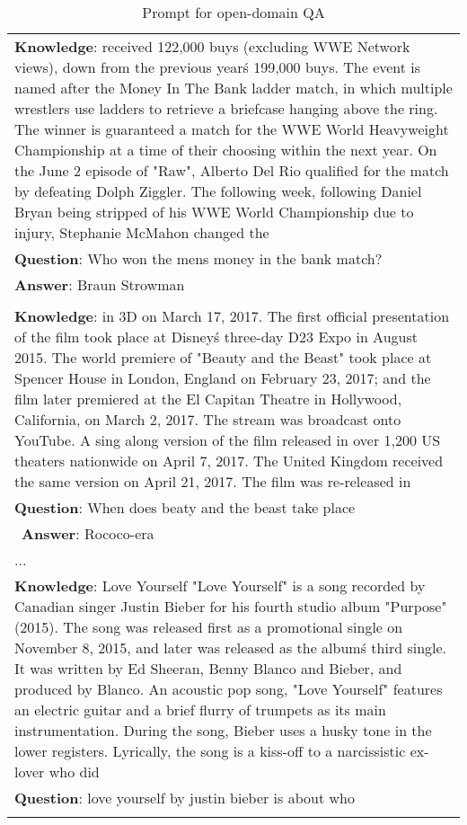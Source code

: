 \documentclass[nohyperref]{article}
\theoremstyle{plain}
\theoremstyle{definition}
\theoremstyle{remark}
\begin{document}
\begin{table*} []
\small
\begin{tabularx}{\textwidth}{m{17cm}}
\toprule
\textbf{Knowledge}: received 122,000 buys (excluding WWE Network views), down from the previous year\'s 199,000 buys. The event is named after the Money In The Bank ladder match, in which multiple wrestlers use ladders to retrieve a briefcase hanging above the ring. The winner is guaranteed a match for the WWE World Heavyweight Championship at a time of their choosing within the next year. On the June 2 episode of "Raw", Alberto Del Rio qualified for the match by defeating Dolph Ziggler. The following week, following Daniel Bryan being stripped of his WWE World Championship due to injury, Stephanie McMahon changed the \\ 
\textbf{Question}: Who won the mens money in the bank match? \\
\textbf{Answer}: Braun Strowman \\
\\
\textbf{Knowledge}: in 3D on March 17, 2017. The first official presentation of the film took place at Disney\'s three-day D23 Expo in August 2015. The world premiere of "Beauty and the Beast" took place at Spencer House in London, England on February 23, 2017; and the film later premiered at the El Capitan Theatre in Hollywood, California, on March 2, 2017. The stream was broadcast onto YouTube. A sing along version of the film released in over 1,200 US theaters nationwide on April 7, 2017. The United Kingdom received the same version on April 21, 2017. The film was re-released in \\ 
\textbf{Question}: When does beaty and the beast take place \\\
\textbf{Answer}: Rococo-era \\
... \\
\textbf{Knowledge}: Love Yourself "Love Yourself" is a song recorded by Canadian singer Justin Bieber for his fourth studio album "Purpose" (2015). The song was released first as a promotional single on November 8, 2015, and later was released as the album\'s third single. It was written by Ed Sheeran, Benny Blanco and Bieber, and produced by Blanco. An acoustic pop song, "Love Yourself" features an electric guitar and a brief flurry of trumpets as its main instrumentation. During the song, Bieber uses a husky tone in the lower registers. Lyrically, the song is a kiss-off to a narcissistic ex-lover who did \\
\textbf{Question}: love yourself by justin bieber is about who \\
 \\
\bottomrule
\end{tabularx}
\caption{Prompt for open-domain QA}
\label{tab:full_instructions1}
\end{table*} 
 
\end{document}
